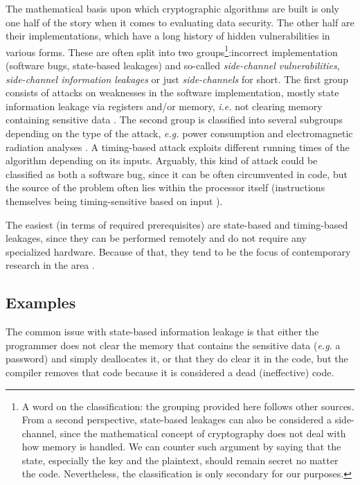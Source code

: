 \documentclass[a4paper,10pt,openright]{memoir}
\newcommand{\ie}{\emph{i.e.}\xspace}
\newcommand{\eg}{\emph{e.g.}\xspace}
\newcommand{\term}[1]{\textit{#1}}
\begin{document}
The mathematical basis upon which cryptographic algorithms are built is 
only one half of the story when it comes to evaluating data security. 
The other half are their implementations, which have a long history of 
hidden vulnerabilities in various forms. These are often split into two 
groups\footnote{A word on the classification: the grouping provided 
here follows other sources. From a second perspective, state-based 
leakages can also be considered a side-channel, since the mathematical 
concept of cryptography does not deal with how memory is handled. We 
can counter such argument by saying that the state, especially the key 
and the plaintext, should remain secret no matter the code. 
Nevertheless, the classification is only secondary for our 
purposes.}:incorrect implementation (software bugs, state-based 
leakages) and so-called \term{side-channel vulnerabilities}, 
\term{side-channel information leakages} or just \term{side-channels} 
for short. The first group consists of attacks on weaknesses in the 
software implementation, mostly state information leakage via registers 
and/or memory, \ie not clearing memory containing sensitive data 
\cite{Chow:2004}. The second group is classified into several subgroups 
depending on the type of the attack, \eg power consumption and 
electromagnetic radiation analyses \cite{Spreitzer:2016}. A 
timing-based attack exploits different running times of the algorithm 
depending on its inputs. Arguably, this kind of attack could be 
classified as both a software bug, since it can be often circumvented 
in code, but the source of the problem often lies within the processor 
itself (instructions themselves being timing-sensitive based on input 
\cite{TimingRC5}).

The easiest (in terms of required prerequisites) are state-based and 
timing-based leakages, since they can be performed remotely and do not 
require any specialized hardware. Because of that, they tend to be the 
focus of contemporary research in the area 
\cite{BondEtal:2017:Vale}\cite{whatyouc}.

\subsection{Examples}

The common issue with state-based information leakage is that either 
the programmer does not clear the memory that contains the sensitive 
data (\eg a password) and simply deallocates it, or that they do clear 
it in the code, but the compiler removes that code because it is 
considered a dead (ineffective) code.
\end{document}

